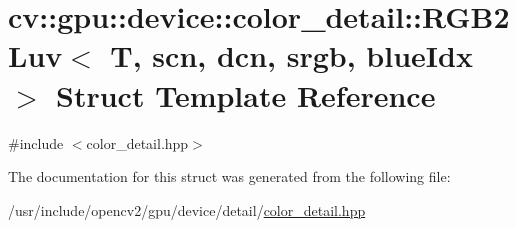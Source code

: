 \hypertarget{structcv_1_1gpu_1_1device_1_1color__detail_1_1RGB2Luv}{\section{cv\-:\-:gpu\-:\-:device\-:\-:color\-\_\-detail\-:\-:R\-G\-B2\-Luv$<$ T, scn, dcn, srgb, blue\-Idx $>$ Struct Template Reference}
\label{structcv_1_1gpu_1_1device_1_1color__detail_1_1RGB2Luv}
}


{\ttfamily \#include $<$color\-\_\-detail.\-hpp$>$}



The documentation for this struct was generated from the following file\-:\begin{DoxyCompactItemize}
\item 
/usr/include/opencv2/gpu/device/detail/\hyperlink{color__detail_8hpp}{color\-\_\-detail.\-hpp}\end{DoxyCompactItemize}
